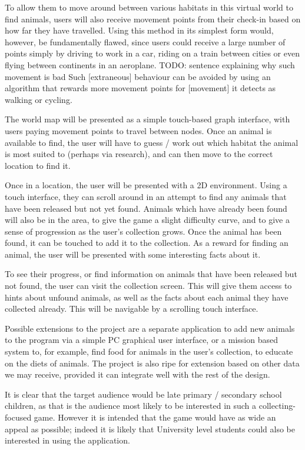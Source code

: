\documentclass[12pt,a4paper,twoside]{article}
\begin{document}
To allow them to move around between various habitats in this virtual world to find animals, users will also receive movement points from their check-in based on how far they have travelled.   %
Using this method in its simplest form would, however, be fundamentally flawed, since users could receive a large number of points simply by driving to work in a car, riding on a train between cities or even flying between continents in an aeroplane.    %
TODO: sentence explaining why such movement is bad
Such [extraneous] behaviour can be avoided by using an algorithm that rewards more movement points for [movement] it detects as walking or cycling.   %

The world map will be presented as a simple touch-based graph interface, with users paying movement points to travel between nodes.
Once an animal is available to find, the user will have to guess / work out which habitat the animal is most suited to (perhaps via research), and can then move to the correct location to find it.

Once in a location, the user will be presented with a 2D environment.
Using a touch interface, they can scroll around in an attempt to find any animals that have been released but not yet found.
Animals which have already been found will also be in the area, to give the game a slight difficulty curve, and to give a sense of progression as the user's collection grows.
Once the animal has been found, it can be touched to add it to the collection.
As a reward for finding an animal, the user will be presented with some interesting facts about it.

To see their progress, or find information on animals that have been released but not found, the user can visit the collection screen.
This will give them access to hints about unfound animals, as well as the facts about each animal they have collected already.
This will be navigable by a scrolling touch interface.

Possible extensions to the project are a separate application to add new animals to the program via a simple PC graphical user interface, or a mission based system to, for example, find food for animals in the user's collection, to educate on the diets of animals.
The project is also ripe for extension based on other data we may receive, provided it can integrate well with the rest of the design.

It is clear that the target audience would be late primary / secondary school children, as that is the audience most likely to be interested in such a collecting-focused game.
However it is intended that the game would have as wide an appeal as possible; indeed it is likely that University level students could also be interested in using the application.
\end{document}
